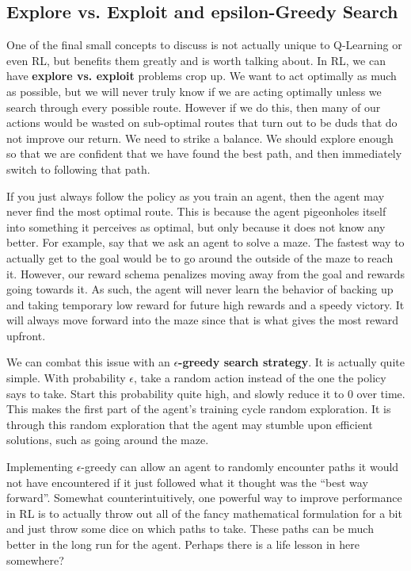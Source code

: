 \subsection{Explore vs. Exploit and epsilon-Greedy Search}
\begin{flushleft}
    \large One of the final small concepts to discuss is not actually unique to Q-Learning or even RL, but benefits them greatly and is worth talking about. In RL, we can have \textbf{explore vs. exploit} problems crop up. We want to act optimally as much as possible, but we will never truly know if we are acting optimally unless we search through every possible route. However if we do this, then many of our actions would be wasted on sub-optimal routes that turn out to be duds that do not improve our return. We need to strike a balance. We should explore enough so that we are confident that we have found the best path, and then immediately switch to following that path. \break

    If you just always follow the policy as you train an agent, then the agent may never find the most optimal route. This is because the agent pigeonholes itself into something it perceives as optimal, but only because it does not know any better. For example, say that we ask an agent to solve a maze. The fastest way to actually get to the goal would be to go around the outside of the maze to reach it. However, our reward schema penalizes moving away from the goal and rewards going towards it. As such, the agent will never learn the behavior of backing up and taking temporary low reward for future high rewards and a speedy victory. It will always move forward into the maze since that is what gives the most reward upfront. \break

    We can combat this issue with an \textbf{$\epsilon$-greedy search strategy}. It is actually quite simple. With probability $\epsilon$, take a random action instead of the one the policy says to take. Start this probability quite high, and slowly reduce it to 0 over time. This makes the first part of the agent's training cycle random exploration. It is through this random exploration that the agent may stumble upon efficient solutions, such as going around the maze. \break
    
    Implementing $\epsilon$-greedy can allow an agent to randomly encounter paths it would not have encountered if it just followed what it thought was the ``best way forward''. Somewhat counterintuitively, one powerful way to improve performance in RL is to actually throw out all of the fancy mathematical formulation for a bit and just throw some dice on which paths to take. These paths can be much better in the long run for the agent. Perhaps there is a life lesson in here somewhere?
\end{flushleft}

